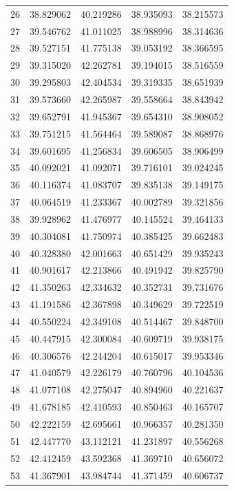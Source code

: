 \begin{table}
\begin{tabular}{rrrrr}
26 & 38.829062 & 40.219286 & 38.935093 & 38.215573 \\
27 & 39.546762 & 41.011025 & 38.988996 & 38.314636 \\
28 & 39.527151 & 41.775138 & 39.053192 & 38.366595 \\
29 & 39.315020 & 42.262781 & 39.194015 & 38.516559 \\
30 & 39.295803 & 42.404534 & 39.319335 & 38.651939 \\
31 & 39.573660 & 42.265987 & 39.558664 & 38.843942 \\
32 & 39.652791 & 41.945367 & 39.654310 & 38.908052 \\
33 & 39.751215 & 41.564464 & 39.589087 & 38.868976 \\
34 & 39.601695 & 41.256834 & 39.606505 & 38.906499 \\
35 & 40.092021 & 41.092071 & 39.716101 & 39.024245 \\
36 & 40.116374 & 41.083707 & 39.835138 & 39.149175 \\
37 & 40.064519 & 41.233367 & 40.002789 & 39.321856 \\
38 & 39.928962 & 41.476977 & 40.145524 & 39.464133 \\
39 & 40.304081 & 41.750974 & 40.385425 & 39.662483 \\
40 & 40.328380 & 42.001663 & 40.651429 & 39.935243 \\
41 & 40.901617 & 42.213866 & 40.491942 & 39.825790 \\
42 & 41.350263 & 42.334632 & 40.352731 & 39.731676 \\
43 & 41.191586 & 42.367898 & 40.349629 & 39.722519 \\
44 & 40.550224 & 42.349108 & 40.514467 & 39.848700 \\
45 & 40.447915 & 42.300084 & 40.609719 & 39.938175 \\
46 & 40.306576 & 42.244204 & 40.615017 & 39.953346 \\
47 & 41.040579 & 42.226179 & 40.760796 & 40.104536 \\
48 & 41.077108 & 42.275047 & 40.894960 & 40.221637 \\
49 & 41.678185 & 42.410593 & 40.850463 & 40.165707 \\
50 & 42.222159 & 42.695661 & 40.966357 & 40.281350 \\
51 & 42.447770 & 43.112121 & 41.231897 & 40.556268 \\
52 & 42.412459 & 43.592368 & 41.369710 & 40.656072 \\
53 & 41.367901 & 43.984744 & 41.371459 & 40.606737 \\

\end{tabular}
\end{table}
